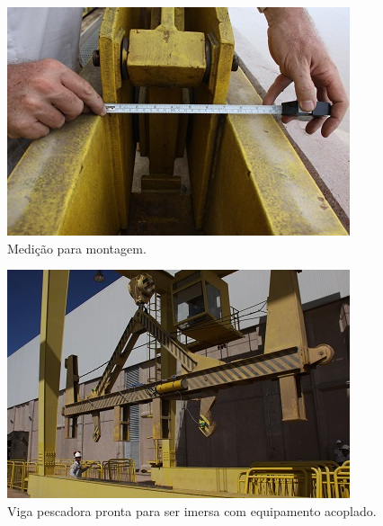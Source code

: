 \begin{figure}[h!]
  \centering
  \includegraphics[width=1\linewidth]{Fotos/Janeiro2015/9.JPG}
  \caption{Medição para montagem.}
  \label{jan20152}
\end{figure}

\begin{figure}[h!]
  \centering
  \includegraphics[width=1\linewidth]{Fotos/Janeiro2015/13.JPG}
  \caption{Viga pescadora pronta para ser imersa com equipamento acoplado.}
  \label{jan20153}
\end{figure}

